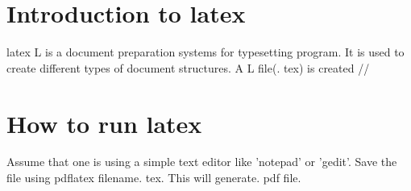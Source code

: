 \documentclass[a5paper, 50pt]{article}
\begin{document}
\section{Introduction to latex}latex
L is a document preparation systems for typesetting program. It is used to create
different types of document structures. A L file(. tex) is created //
\section{How to run latex}
Assume that one is using a simple text editor like 'notepad' or 'gedit'. Save the file using pdflatex filename. tex. This will generate. pdf file. \\
\end{document}
